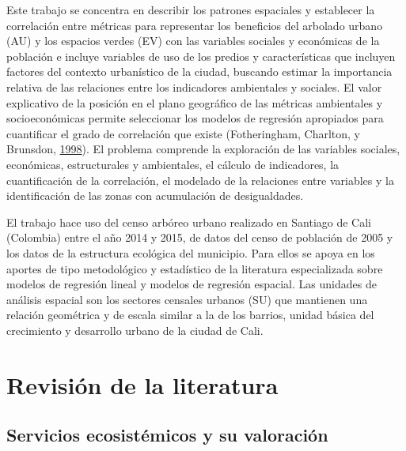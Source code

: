 \documentclass[12pt,a4paper,oneside, openany]{book}
\theoremstyle{definition}
\theoremstyle{definition}
\theoremstyle{definition}
\theoremstyle{remark}
\begin{document}
Este trabajo se concentra en describir los patrones espaciales y
establecer la correlación entre métricas para representar los beneficios
del arbolado urbano (AU) y los espacios verdes (EV) con las variables
sociales y económicas de la población e incluye variables de uso de los
predios y características que incluyen factores del contexto urbanístico
de la ciudad, buscando estimar la importancia relativa de las relaciones
entre los indicadores ambientales y sociales. El valor explicativo de la
posición en el plano geográfico de las métricas ambientales y
socioeconómicas permite seleccionar los modelos de regresión apropiados
para cuantificar el grado de correlación que existe (Fotheringham,
Charlton, y Brunsdon,
\protect\hyperlink{ref-fotheringham_geographically_1998}{1998}). El
problema comprende la exploración de las variables sociales, económicas,
estructurales y ambientales, el cálculo de indicadores, la
cuantificación de la correlación, el modelado de la relaciones entre
variables y la identificación de las zonas con acumulación de
desigualdades.

El trabajo hace uso del censo arbóreo urbano realizado en Santiago de
Cali (Colombia) entre el año 2014 y 2015, de datos del censo de
población de 2005 y los datos de la estructura ecológica del municipio.
Para ellos se apoya en los aportes de tipo metodológico y estadístico de
la literatura especializada sobre modelos de regresión lineal y modelos
de regresión espacial. Las unidades de análisis espacial son los
sectores censales urbanos (SU) que mantienen una relación geométrica y
de escala similar a la de los barrios, unidad básica del crecimiento y
desarrollo urbano de la ciudad de Cali.

\chapter{Revisión de la literatura}\label{revlit}

\section{Servicios ecosistémicos y su
valoración}\label{servicios-ecosistuxe9micos-y-su-valoraciuxf3n}
\end{document}
